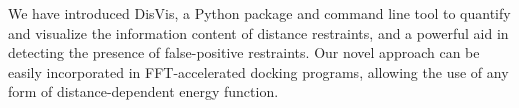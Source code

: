 
We have introduced DisVis, a Python package and command line tool to quantify
and visualize the information content of distance restraints, and a powerful
aid in detecting the presence of false-positive restraints. Our novel approach
can be easily incorporated in FFT-accelerated docking programs, allowing the
use of any form of distance-dependent energy function.
